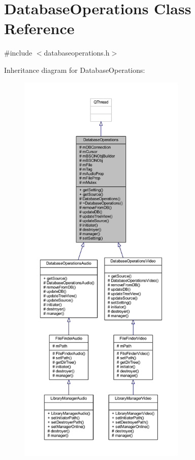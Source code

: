 \hypertarget{class_database_operations}{\section{Database\-Operations Class Reference}
\label{class_database_operations}
}


{\ttfamily \#include $<$databaseoperations.\-h$>$}



Inheritance diagram for Database\-Operations\-:
\nopagebreak
\begin{figure}[H]
\begin{center}
\leavevmode
\includegraphics[height=550pt]{class_database_operations__inherit__graph}
\end{center}
\end{figure}


